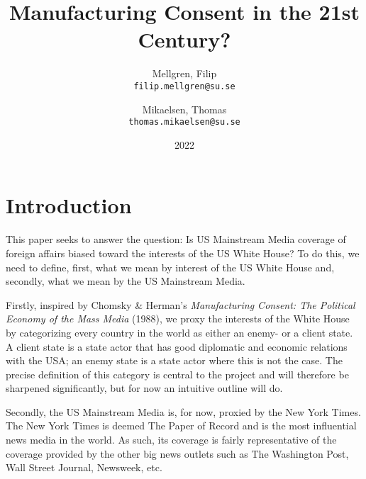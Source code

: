 

\title{Manufacturing Consent in the 21st Century?}
\author{
	Mellgren, Filip\\
	\texttt{filip.mellgren@su.se}
	\and
	Mikaelsen, Thomas\\
	\texttt{thomas.mikaelsen@su.se}
}
\date{2022}


	
	\maketitle
	
	
	\section{Introduction}	
	This paper seeks to answer the question: Is US Mainstream Media coverage of foreign affairs biased toward the interests of the US White House? To do this, we need to define,  first, what we mean by interest of the US White House and, secondly, what we mean by the US Mainstream Media. 
	
	Firstly, inspired by Chomsky \& Herman's \textit{Manufacturing Consent: The Political Economy of the Mass Media} (1988),  we proxy the interests of the White House by categorizing every country in the world as either an enemy- or a client state. A client state is a state actor that has good diplomatic and economic relations with the USA; an enemy state is a state actor where this is not the case. The precise definition of this category is central to the project and will therefore be sharpened significantly, but for now an intuitive outline will do.
	
	Secondly,  the US Mainstream Media is, for now,  proxied by the New York Times. The New York Times is deemed The Paper of Record and is the most influential news media in the world. As such, its coverage is fairly representative of the coverage provided by the other big news outlets such as The Washington Post, Wall Street Journal, Newsweek, etc. 
	
